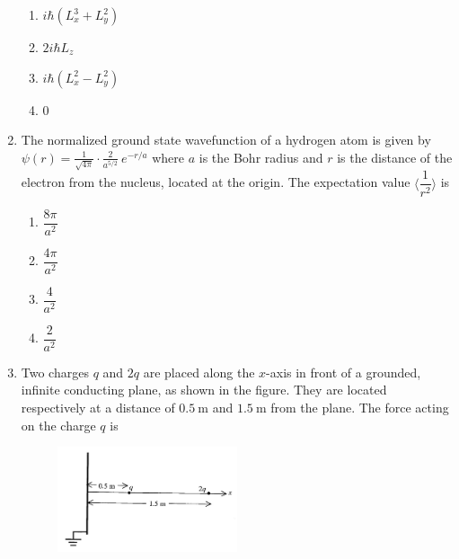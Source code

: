 \documentclass[journal,12pt,onecolumn]{IEEEtran}
\begin{document}
\begin{enumerate}
\hfill{}

\begin{multicols}{4}
\begin{enumerate}
    \item $i\hbar \left(L_{x}^{3} + L_{y}^{2}\right)$
    \item $2 i \hbar L_{z}$
    \item $i\hbar \left(L_{x}^{2} - L_{y}^{2}\right)$
    \item $0$
\end{enumerate}
\end{multicols}

\item The normalized ground state wavefunction of a hydrogen atom is given by $\psi(r) = \frac{1}{\sqrt{4\pi}} \cdot \frac{2}{a^{5/2}} \ e^{-r/a}$
where $a$ is the Bohr radius and $r$ is the distance of the electron from the nucleus, located at the origin.  
The expectation value $\langle \dfrac{1}{r^{2}} \rangle$ is

\hfill{}

\begin{multicols}{4}
\begin{enumerate}
    \item $\dfrac{8\pi}{a^{2}}$
    \item $\dfrac{4\pi}{a^{2}}$
    \item $\dfrac{4}{a^{2}}$
    \item $\dfrac{2}{a^{2}}$
\end{enumerate}
\end{multicols}

\item Two charges $q$ and $2q$ are placed along the $x$-axis in front of a grounded, infinite conducting plane, as shown in the figure. They are located respectively at a distance of $0.5 \ \mathrm{m}$ and $1.5 \ \mathrm{m}$ from the plane. The force acting on the charge $q$ is



\begin{figure}[ht!]
    \centering
    \includegraphics[width=0.5\textwidth]{fig2.jpeg}
    \caption{}
    \label{fig:fig2.jpeg}
\end{figure}


\end{enumerate}
\end{document}
